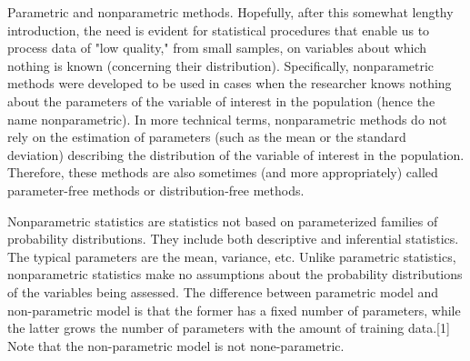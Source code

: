 Parametric and nonparametric methods. Hopefully, after this somewhat lengthy introduction, the need is evident for statistical procedures that enable us to process data of "low quality," from small samples, on variables about which nothing is known (concerning their distribution). Specifically, nonparametric methods were developed to be used in cases when the researcher knows nothing about the parameters of the variable of interest in the population (hence the name nonparametric). In more technical terms, nonparametric methods do not rely on the estimation of parameters (such as the mean or the standard deviation) describing the distribution of the variable of interest in the population. Therefore, these methods are also sometimes (and more appropriately) called parameter-free methods or distribution-free methods.

Nonparametric statistics are statistics not based on parameterized families of probability distributions. 
They include both descriptive and inferential statistics. The typical parameters are the mean, variance, etc. Unlike parametric statistics, nonparametric statistics make no assumptions about the probability distributions of the variables being assessed. The difference between parametric model and non-parametric model is that the former has a fixed number of parameters, while the latter grows the number of parameters with the amount of training data.[1] Note that the non-parametric model is not none-parametric.


